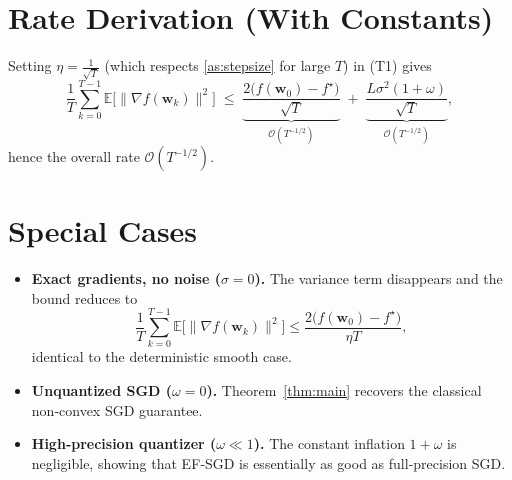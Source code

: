 \documentclass{article}
\newcommand{\E}{\mathbb{E}}
\begin{document}
\section*{Rate Derivation (With Constants)}
Setting $\eta = \frac{1}{\sqrt{T}}$ (which respects \ref{as:stepsize} for large $T$) in (T1) gives
\[
\frac{1}{T}\sum_{k=0}^{T-1}\E\!\big[\|\nabla f(\bm w_k)\|^2\big]
\;\le\;
\underbrace{\frac{2\big(f(\bm w_0)-f^\star\big)}{\sqrt{T}}}_{\mathcal O(T^{-1/2})}
\;+\;
\underbrace{\frac{L\sigma^2(1+\omega)}{\sqrt{T}}}_{\mathcal O(T^{-1/2})},
\]
hence the overall rate $\mathcal O(T^{-1/2})$.

\section*{Special Cases}
\begin{itemize}
\item \textbf{Exact gradients, no noise ($\sigma=0$).} The variance term disappears and the bound reduces to 
\[
\frac{1}{T}\sum_{k=0}^{T-1}\E\!\big[\|\nabla f(\bm w_k)\|^2\big]\le
\frac{2\big(f(\bm w_0)-f^\star\big)}{\eta T},
\]
identical to the deterministic smooth case.
\item \textbf{Unquantized SGD ($\omega=0$).} Theorem~\ref{thm:main} recovers the classical non‑convex SGD guarantee.
\item \textbf{High‑precision quantizer ($\omega\ll1$).} The constant inflation $1+\omega$ is negligible, showing that EF‑SGD is essentially as good as full‑precision SGD.
\end{itemize}
\end{document}
